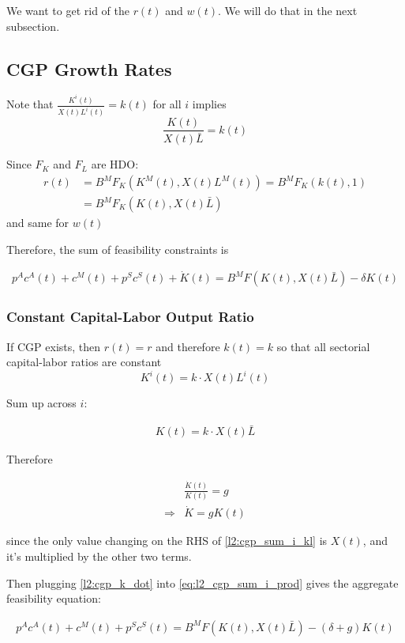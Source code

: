 \documentclass[10pt]{article}
\begin{document}
We want to get rid of the $r(t)$ and $w(t)$. 
We will do that in the next subsection.

\subsection{CGP Growth Rates}

Note that $\frac{K^i(t)}{X(t) L^i(t)}=k(t)$ for all $i$ implies
$$
\frac{K(t)}{X(t) \bar{L}}=k(t)
$$

Since $F_K$ and $F_L$ are HDO:
$$
\begin{aligned}
r(t) & =B^M F_K\left(K^M(t), X(t) L^M(t)\right)=B^M F_K(k(t), 1) \\
& =B^M F_K(K(t), X(t) \bar{L})
\end{aligned}
$$
and same for $w(t)$

Therefore, the sum of feasibility constraints is

\begin{align}
    p^A c^A(t)+c^M(t)+p^S c^S(t)+\dot{K}(t)=B^M F(K(t), X(t) \bar{L})-\delta K(t) \label{eq:l2_cgp_sum_i_prod}
\end{align}

\subsubsection{Constant Capital-Labor Output Ratio}

If CGP exists, then $r(t)=r$ and therefore $k(t)=k$ so that all sectorial capital-labor ratios are constant
$$
K^i(t)=k \cdot X(t) L^i(t)
$$

Sum up across $i$:

\begin{align}
    K(t)=k \cdot X(t) \bar{L} \label{l2:cgp_sum_i_kl}
\end{align}

Therefore

\begin{align}
    &\frac{\dot{K}(t)}{K(t)}=g \\
    \Rightarrow &\dot{K} = g K(t) \label{l2:cgp_k_dot}
\end{align}

since the only value changing on the RHS of \eqref{l2:cgp_sum_i_kl} is $X(t)$,
and it's multiplied by the other two terms.

Then plugging \eqref{l2:cgp_k_dot} into \eqref{eq:l2_cgp_sum_i_prod} gives the aggregate feasibility equation:

\begin{align}
    p^A c^A(t)+c^M(t)+p^S c^S(t)=B^M F(K(t), X(t) \bar{L})-(\delta+g) K(t) \label{eq:l2_agg_feas_eq_new_kdot}
\end{align}
\end{document}
